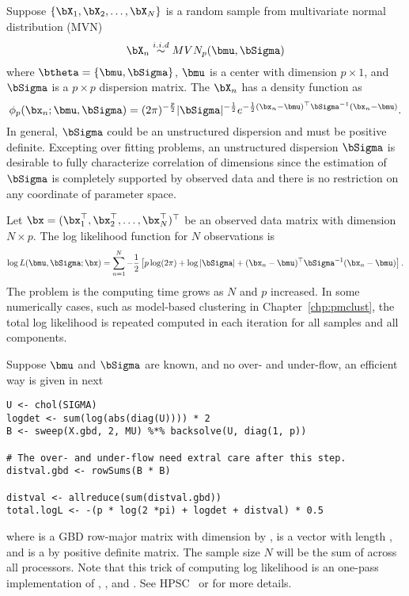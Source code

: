 Suppose $\{\bX_1,\bX_2,\ldots,\bX_N\}$ is a random sample from
multivariate normal distribution
(MVN)
\begin{equation}
\bX_n \stackrel{i.i.d}{\sim} MVN_p(\bmu, \bSigma)
\label{eqn:mvn_p}
\end{equation}
where $\btheta = \{\bmu, \bSigma\}$, $\bmu$ is a center with
dimension $p\times 1$, and $\bSigma$ is a $p\times p$ dispersion
matrix.
The $\bX_n$ has a density function as
\begin{equation*}
\displaystyle
\phi_p(\bx_n; \bmu, \bSigma) =
(2\pi)^{-\frac{p}{2}} |\bSigma|^{-\frac{1}{2}}
e^{-\frac{1}{2} (\bx_n - \bmu)^\top \bSigma^{-1} (\bx_n - \bmu)}.
\end{equation*}
In general, $\bSigma$ could be an unstructured dispersion and must be positive
definite. Excepting over fitting problems,
an unstructured dispersion $\bSigma$ is desirable to fully
characterize correlation of dimensions since the estimation of
$\bSigma$ is completely supported by observed data and there is no
restriction on any coordinate of parameter space.

Let $\bx = (\bx_1^\top, \bx_2^\top, \ldots, \bx_N^\top)^\top$
be an observed data matrix with dimension $N\times p$.
The log likelihood function for $N$ observations is
\begin{equation*}
\displaystyle
\log L(\bmu, \bSigma; \bx) = \sum_{n = 1}^N
-\frac{1}{2}
\left[
p\log(2\pi) + \log|\bSigma| + (\bx_n - \bmu)^\top \bSigma^{-1} (\bx_n - \bmu)
\right].
\label{eqn:log_likelihood_mvn_p}
\end{equation*}
The problem is the computing time grows as $N$ and $p$ increased.
In some numerically cases, such as model-based clustering
in Chapter~\ref{chp:pmclust}, the total log likelihood is
repeated computed in each iteration for all samples and all components.

Suppose $\bmu$ and $\bSigma$ are known, and no over- and under-flow,
an efficient way is given in next
\begin{lstlisting}[language=rr,title=R Code]
U <- chol(SIGMA)
logdet <- sum(log(abs(diag(U)))) * 2
B <- sweep(X.gbd, 2, MU) %*% backsolve(U, diag(1, p))

# The over- and under-flow need extral care after this step.
distval.gbd <- rowSums(B * B)

distval <- allreduce(sum(distval.gbd))
total.logL <- -(p * log(2 *pi) + logdet + distval) * 0.5
\end{lstlisting}
where  is a GBD row-major matrix with dimension
 by ,  is a vector with length , and
 is a  by  positive definite matrix.
The sample size $N$ will be the sum of  across all processors.
Note that this trick of computing log likelihood is an one-pass implementation
of , , and .
See HPSC~\citep{hpsc2011} or \citet{gvl} for more details.




